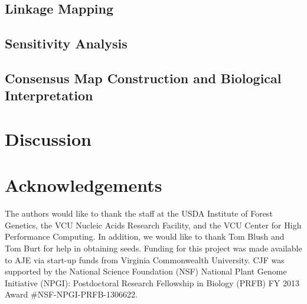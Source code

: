 \documentclass[11pt]{article}
\begin{document}
\subsection*{Linkage Mapping}

\subsection*{Sensitivity Analysis}

\subsection*{Consensus Map Construction and Biological Interpretation}


\section*{Discussion}

\section*{Acknowledgements}

The authors would like to thank the staff at the USDA Institute of Forest Genetics, the 
VCU Nucleic Acids Research Facility, and the VCU Center for High Performance Computing. 
In addition, we would like to thank Tom Blush and Tom Burt for help in obtaining 
seeds. Funding for this project was made available to AJE via start-up funds from Virginia 
Commonwealth University. CJF was supported by the National Science Foundation (NSF) National Plant Genome 
Initiative (NPGI): Postdoctoral Research Fellowship in Biology (PRFB) FY 2013 Award \#NSF-NPGI-PRFB-1306622.

\clearpage

\singlespacing


\end{document}
